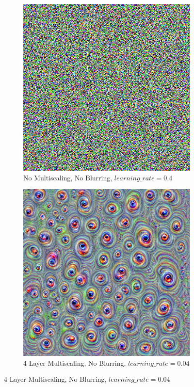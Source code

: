 \begin{figure}
    \captionsetup{justification=centering}

    \begin{subfigure}[t]{0.31\textwidth}
        \captionsetup{justification=centering}
        \centering
        \includegraphics[width=.7\linewidth]{figuras/feat_vis/experiments/intermediary/l8/random_image_pl1_lr4e-1_layer17_no-blur.png}
        \caption{No Multiscaling, No Blurring, \(learning\_rate = 0.4\)}
    \end{subfigure}
    \hfill
    \begin{subfigure}[t]{0.31\textwidth}
        \captionsetup{justification=centering}
        \centering
        \includegraphics[width=.7\linewidth]{figuras/feat_vis/experiments/intermediary/l8/random_image_pl4_lr4e-2_layer17_no-blur.png}
        \caption{4 Layer Multiscaling, No Blurring, \(learning\_rate = 0.04\)}

\end{subfigure}
\end{figure}
